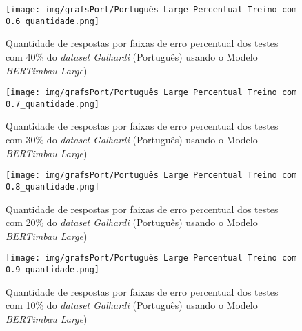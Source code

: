 \begin{figure}[h!]
\texttt{[image: img/grafsPort/Português Large Percentual Treino com 0.6\_quantidade.png]}
\caption{Quantidade de respostas por faixas de erro percentual dos testes com 40\% do \textit{dataset Galhardi} (Português) usando o Modelo \textit{BERTimbau Large})}\label{figure:34}
\end{figure}

\begin{figure}[h!]
\texttt{[image: img/grafsPort/Português Large Percentual Treino com 0.7\_quantidade.png]}
\caption{Quantidade de respostas por faixas de erro percentual dos testes com 30\% do \textit{dataset Galhardi} (Português) usando o Modelo \textit{BERTimbau Large})}\label{figure:35}
\end{figure}

\begin{figure}[h!]
\texttt{[image: img/grafsPort/Português Large Percentual Treino com 0.8\_quantidade.png]}
\caption{Quantidade de respostas por faixas de erro percentual dos testes com 20\% do \textit{dataset Galhardi} (Português) usando o Modelo \textit{BERTimbau Large})}\label{figure:36}
\end{figure}

\begin{figure}[h!]
\texttt{[image: img/grafsPort/Português Large Percentual Treino com 0.9\_quantidade.png]}
\caption{Quantidade de respostas por faixas de erro percentual dos testes com 10\% do \textit{dataset Galhardi} (Português) usando o Modelo \textit{BERTimbau Large})}\label{figure:37}
\end{figure}